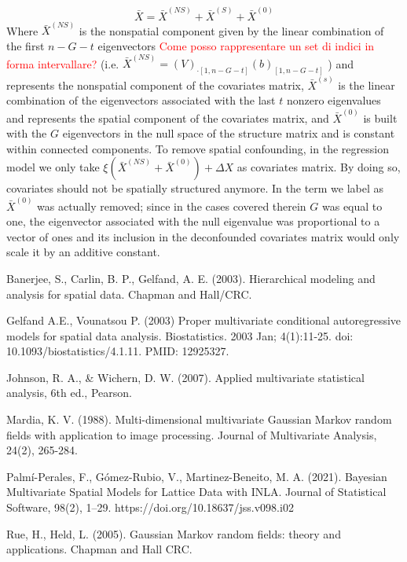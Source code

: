 \documentclass{article}
\begin{document}
$$
\bar{X} = \bar{X}^{(NS)} + \bar{X}^{(S)} + \bar{X}^{(0)}
$$
Where $\bar{X}^{(NS)}$ is the nonspatial component given by the linear combination of the first $n-G-t$ eigenvectors \textcolor{red}{Come posso rappresentare un set di indici in forma intervallare?} (i.e. $\bar{X}^{(NS)} = (V)_{\cdot[1, n-G-t]}(b)_{[1, n-G-t]}$ ) and represents the nonspatial component of the covariates matrix, $\bar{X}^{(s)}$ is the linear combination of the eigenvectors associated with the last $t$ nonzero eigenvalues and represents the spatial component of the covariates matrix, and $\bar{X}^{(0)}$ is built with the $G$ eigenvectors in the null space of the structure matrix and is constant within connected components. To remove spatial confounding, in the regression model we only take $\xi \left(\bar{X}^{(NS)} + \bar{X}^{(0)}\right) + \Delta X$ as covariates matrix. By doing so, covariates should not be spatially structured anymore. In \cite{Urdangarin24} the term we label as $\bar{X}^{(0)}$ was actually removed; since in the cases covered therein $G$ was equal to one, the eigenvector associated with the null eigenvalue was proportional to a vector of ones and its inclusion in the deconfounded covariates matrix would only scale it by an additive constant.\\










\begin{thebibliography}{99}

  Banerjee, S., Carlin, B. P.,  Gelfand, A. E. (2003). Hierarchical modeling and analysis for spatial data. Chapman and Hall/CRC.
 
Gelfand A.E., Vounatsou P. (2003) Proper multivariate conditional autoregressive models for spatial data analysis. Biostatistics. 2003 Jan; 4(1):11-25. doi: 10.1093/biostatistics/4.1.11. PMID: 12925327.

Johnson, R. A., \& Wichern, D. W. (2007). Applied multivariate statistical analysis, 6th ed., Pearson. %

 Mardia, K. V. (1988). Multi-dimensional multivariate Gaussian Markov random fields with application to image processing. Journal of Multivariate Analysis, 24(2), 265-284.

Palmí-Perales, F., Gómez-Rubio, V.,  Martinez-Beneito, M. A. (2021). Bayesian Multivariate Spatial Models for Lattice Data with INLA. Journal of Statistical Software, 98(2), 1–29. https://doi.org/10.18637/jss.v098.i02

Rue, H., Held, L. (2005). Gaussian Markov random fields: theory and applications. Chapman and Hall CRC. %




\end{thebibliography}
\end{document}
